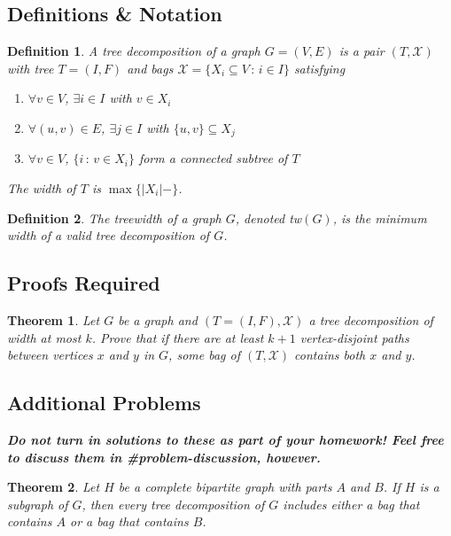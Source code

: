 \documentclass{article}
\newtheorem*{theorem}{Theorem}
\newtheorem{definition}{Definition}
\begin{document}
\subsection*{Definitions \& Notation}
\begin{definition}
    A \emph{tree decomposition} of a graph $G = (V,E)$
    is a pair $(T, \mathcal{X})$ with tree $T = (I,F)$
    and bags $\mathcal{X} = \{X_i \subseteq V \,:\, i \in I \}$
    satisfying
    \begin{enumerate}
      \item $\forall v \in V$, $\exists i \in I$ with $v \in X_i$
      \item $\forall (u,v) \in E$, $\exists j \in I$ with $\{u,v\} \subseteq X_j$
      \item $\forall v \in V$, $\{i \,:\, v \in X_i\}$ form a connected subtree of $T$
    \end{enumerate}
    The \emph{width} of $T$ is $\max\{|X_i| - \}$.
\end{definition}

\begin{definition} The \emph{treewidth} of a graph $G$, denoted tw$(G)$, is the minimum
  width of a valid tree decomposition of $G$.
\end{definition}


\subsection*{Proofs Required}

\begin{theorem} Let $G$ be a graph and $(T = (I,F), \mathcal{X})$ a tree decomposition
  of width at most $k$. Prove that if there are at least $k+1$ vertex-disjoint
  paths between vertices $x$ and $y$ in $G$, some bag of $(T,\mathcal{X})$ contains
  both $x$ and $y$.
\end{theorem}

\subsection*{Additional Problems}
\textbf{\textit{Do not turn in solutions to these as part of your homework! Feel free
to discuss them in \#problem-discussion, however.}}
\begin{theorem} Let $H$ be a complete bipartite graph with parts $A$ and $B$. If $H$
  is a subgraph of $G$, then every tree decomposition of $G$ includes either a bag
  that contains $A$ or a bag that contains $B$.
\end{theorem}
\end{document}
